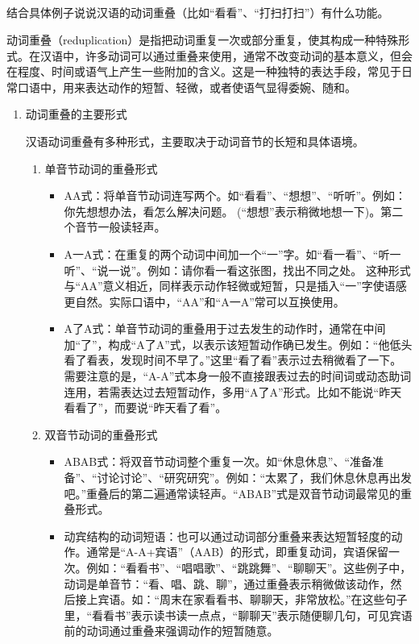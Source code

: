 \documentclass[10pt]{ctexart}
\begin{document}
\subsection{}
{\heiti
结合具体例子说说汉语的动词重叠（比如``看看''、``打扫打扫''）有什么功能。}

\vspace{0.5cm}

动词重叠（reduplication）是指把动词重复一次或部分重复，使其构成一种特殊形式。在汉语中，许多动词可以通过重叠来使用，通常不改变动词的基本意义，但会在程度、时间或语气上产生一些附加的含义。这是一种独特的表达手段，常见于日常口语中，用来表达动作的短暂、轻微，或者使语气显得委婉、随和。

\begin{enumerate}
    \item 动词重叠的主要形式
    
    汉语动词重叠有多种形式，主要取决于动词音节的长短和具体语境。
    \begin{enumerate}[label=(\arabic*)]
        \item 单音节动词的重叠形式
        \begin{itemize}
            \item AA式：将单音节动词连写两个。如``看看''、``想想''、``听听''。例如：你先想想办法，看怎么解决问题。 (``想想''表示稍微地想一下)。第二个音节一般读轻声。
            \item A一A式：在重复的两个动词中间加一个``一''字。如``看一看''、``听一听''、``说一说''。例如：请你看一看这张图，找出不同之处。 这种形式与``AA''意义相近，同样表示动作轻微或短暂，只是插入``一''字使语感更自然。实际口语中，``AA''和``A一A''常可以互换使用。
            \item A了A式：单音节动词的重叠用于过去发生的动作时，通常在中间加``了''，构成``A了A''式，以表示该短暂动作确已发生。例如：``他低头看了看表，发现时间不早了。''这里``看了看''表示过去稍微看了一下。需要注意的是，``A-A''式本身一般不直接跟表过去的时间词或动态助词连用，若需表达过去短暂动作，多用``A了A''形式。比如不能说``昨天看看了''，而要说``昨天看了看''。
        \end{itemize}

        \item 双音节动词的重叠形式
        \begin{itemize}
            \item ABAB式：将双音节动词整个重复一次。如``休息休息''、``准备准备''、``讨论讨论''、``研究研究''。例如：``太累了，我们休息休息再出发吧。''重叠后的第二遍通常读轻声。``ABAB''式是双音节动词最常见的重叠形式。
            \item 动宾结构的动词短语：也可以通过动词部分重叠来表达短暂轻度的动作。通常是``A-A+宾语''（AAB）的形式，即重复动词，宾语保留一次。例如：``看看书''、``唱唱歌''、``跳跳舞''、``聊聊天''。这些例子中，动词是单音节：``看、唱、跳、聊''，通过重叠表示稍微做该动作，然后接上宾语。如：``周末在家看看书、聊聊天，非常放松。''在这些句子里，``看看书''表示读书读一点点，``聊聊天''表示随便聊几句，可见宾语前的动词通过重叠来强调动作的短暂随意。
        \end{itemize}


\end{enumerate}
\end{enumerate}
\end{document}
